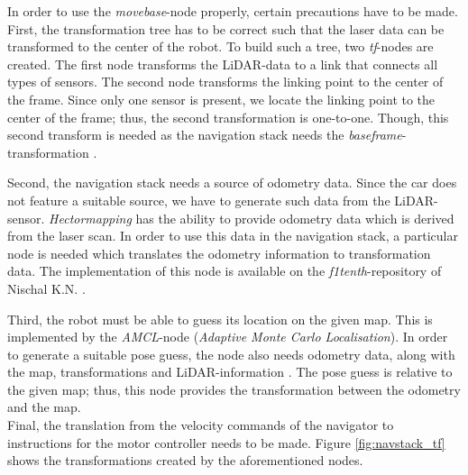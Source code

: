 \documentclass[conference,a4paper]{IEEEtran}
\begin{document}
In order to use the \emph{move\textunderscore base}-node properly, certain precautions have to be made. First, the transformation tree has to be correct such that the laser data can be transformed to the center of the robot. To build such a tree, two \emph{tf}-nodes are created. The first node transforms the LiDAR-data to a link that connects all types of sensors. The second node transforms the linking point to the center of the frame. Since only one sensor is present, we locate the linking point to the center of the frame; thus, the second transformation is one-to-one. Though, this second transform is needed as the navigation stack needs the \emph{base\textunderscore frame}-transformation \cite{Kohlbrecher2012_tf} \cite{Woodall2015}.

Second, the navigation stack needs a source of odometry data. Since the car does not feature a suitable source, we have to generate such data from the LiDAR-sensor. \emph{Hector\textunderscore mapping} has the ability to provide odometry data which is derived from the laser scan. In order to use this data in the navigation stack, a particular node is needed which translates the odometry information to transformation data. The implementation of this node is available on the \emph{f1tenth}-repository of Nischal K.N. \cite{K.N.2016}.

Third, the robot must be able to guess its location on the given map. This is implemented by the \emph{AMCL}-node (\emph{Adaptive Monte Carlo Localisation}). In order to generate a suitable pose guess, the node also needs odometry data, along with the map, transformations and LiDAR-information \cite{Gerkey2016} \cite{Thrun1999}. The pose guess is relative to the given map; thus, this node provides the transformation between the odometry and the map.\\
Final, the translation from the velocity commands of the navigator to instructions for the motor controller needs to be made.
Figure \ref{fig:navstack_tf} shows the transformations created by the aforementioned nodes. 
\end{document}
